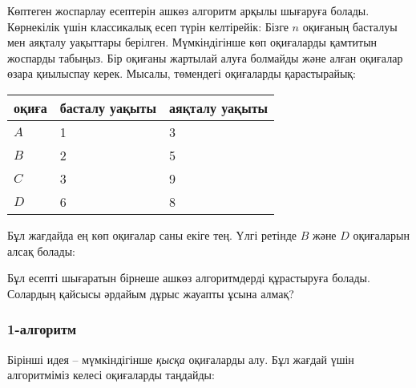 Көптеген жоспарлау есептерін ашкөз алгоритм 
арқылы шығаруға болады. Көрнекілік үшін классикалық есеп түрін келтірейік:
Бізге $n$ оқиғаның басталуы мен аяқталу уақыттары
берілген. Мүмкіндігінше көп оқиғаларды 
қамтитын жоспарды табыңыз. Бір оқиғаны жартылай алуға
болмайды және алған оқиғалар өзара қиылыспау керек.
Мысалы, төмендегі оқиғаларды қарастырайық:
\begin{center}
\begin{tabular}{lll}
оқиға & басталу уақыты & аяқталу уақыты \\
\hline
$A$ & 1 & 3 \\
$B$ & 2 & 5 \\
$C$ & 3 & 9 \\
$D$ & 6 & 8 \\
\end{tabular}
\end{center}
Бұл жағдайда ең көп оқиғалар саны екіге тең.
Үлгі ретінде $B$ және $D$ оқиғаларын алсақ болады:
\begin{center}
\end{center}

Бұл есепті шығаратын бірнеше ашкөз алгоритмдерді
құрастыруға болады. Солардың қайсысы әрдайым дұрыс 
жауапты ұсына алмақ?


\subsubsection*{1-алгоритм}

Бірінші идея -- мүмкіндігінше \emph{қысқа} 
оқиғаларды алу. Бұл жағдай үшін алгоритміміз
келесі оқиғаларды таңдайды:
\begin{center}
\end{center}

